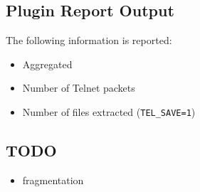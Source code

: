 \documentclass[documentation]{subfiles}
\begin{document}
\subsection{Plugin Report Output}
The following information is reported:
\begin{itemize}
    \item Aggregated {\tt{}}
    \item Number of Telnet packets
    \item Number of files extracted ({\tt TEL\_SAVE=1})
\end{itemize}

\subsection{TODO}
\begin{itemize}
    \item fragmentation
\end{itemize}
\end{document}
